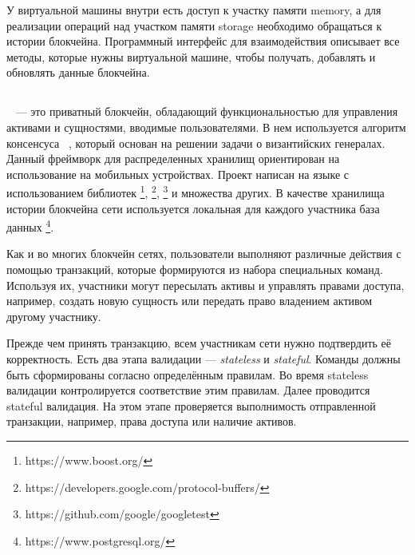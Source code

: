 У виртуальной машины внутри есть доступ к участку памяти me\-mo\-ry, а для реализации операций над участком памяти storage необходимо обращаться к истории блокчейна.
Программный интерфейс для взаимодействия описывает все методы, которые нужны виртуальной машине, чтобы получать, добавлять и обновлять данные блокчейна.


\subsection{}
~\cite{iroha} --- это приватный блокчейн, обладающий функциональностью для управления активами и сущностями, вводимые пользователями.
В нем используется алгоритм консенсуса ~\cite{YAC}, который основан на решении задачи о византийских генералах.
Данный фреймворк для распределенных хранилищ ориентирован на использование на мобильных устройствах.
Проект написан на языке  с использованием библиотек \footnote{https://www.boost.org/}, \footnote{https://developers.google.com/protocol-buffers/}, \footnote{https://github.com/google/googletest} и множества других.
В качестве хранилища истории блокчейна сети используется локальная для каждого участника база данных \footnote{https://www.postgresql.org/}.

Как и во многих блокчейн сетях, пользователи  выполняют различные действия с помощью транзакций, которые формируются из набора специальных команд.
Используя их, участники могут пересылать активы и управлять правами доступа, например, создать новую сущность или передать право владением активом другому участнику.

Прежде чем принять транзакцию, всем участникам сети нужно подтвердить её корректность.
Есть два этапа валидации --- \emph{stateless} и \emph{sta\-te\-ful}.
Команды должны быть сформированы согласно определённым правилам.
Во время stateless валидации контролируется соответствие этим правилам.
Далее проводится stateful валидация. 
На этом этапе проверяется выполнимость отправленной транзакции, например, права доступа или наличие активов.
